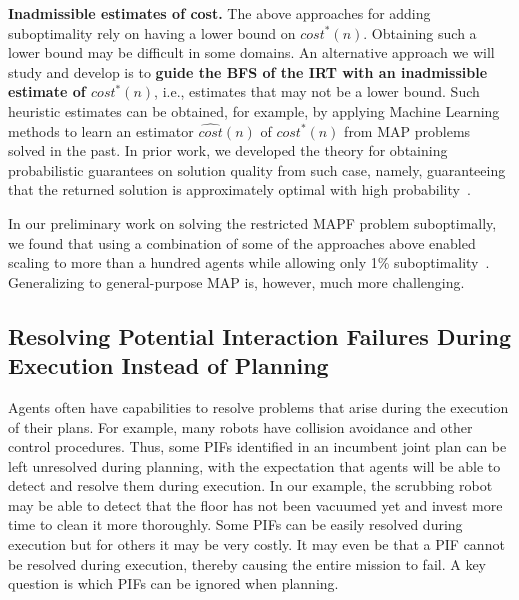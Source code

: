 \documentclass[11pt]{article}
\begin{document}
{\bf Inadmissible estimates of cost.}
The above approaches for adding suboptimality rely on having a lower bound on $cost^*(n)$. Obtaining such a lower bound may be difficult in some domains. An alternative approach we will study and develop is to {\bf guide the BFS of the IRT with an inadmissible estimate of $cost^*(n)$}, i.e., estimates that may not be a lower bound. Such heuristic estimates can be obtained, for example, by applying Machine Learning methods to learn an estimator $\widehat{cost}(n)$ of $cost^*(n)$ from MAP problems solved in the past. 
In prior work, we developed the theory for obtaining probabilistic guarantees on solution quality from such case, namely, guaranteeing that the returned solution is approximately optimal with high probability~\cite{stern2011probably,stern2012search}. 


In our preliminary work on solving the restricted MAPF problem suboptimally, we found that using a combination of some of the approaches above enabled scaling to more than a hundred agents while allowing only 1\% suboptimality~\cite{barer2014suboptimal-socs}. Generalizing to general-purpose MAP is, however, much more challenging. 


\subsection{Resolving Potential Interaction Failures During Execution Instead of Planning}
\label{sec:resolving}

Agents often have capabilities to resolve problems that arise during the execution of their plans. For example, many robots have collision avoidance and other control procedures. 
Thus, some PIFs identified in an incumbent joint plan can be left unresolved during planning, with the expectation that agents will be able to detect and resolve them during execution. In our example, the  scrubbing robot may be able to detect that the floor has not been vacuumed yet and invest more time to clean it more thoroughly. %
Some PIFs can be easily resolved during execution but for others it may be very costly. It may even be that a PIF cannot be resolved during execution, thereby causing the entire mission to fail. A key question is which PIFs can be ignored when planning. 
\end{document}

